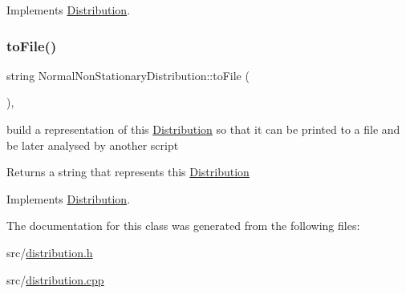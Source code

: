 Implements \mbox{\hyperlink{class_distribution_ac9c74d18549f532caa09ae86d8b25b55}{Distribution}}.

\mbox{\label{class_normal_non_stationary_distribution_a4f2f7cdfacf8b54a0cb2b5237213a693}} 
\subsubsection{\texorpdfstring{to\+File()}{toFile()}}
{\footnotesize\ttfamily string Normal\+Non\+Stationary\+Distribution\+::to\+File (\begin{DoxyParamCaption}{ }\end{DoxyParamCaption})\hspace{0.3cm}{\ttfamily [override]}, {\ttfamily [virtual]}}



build a representation of this \mbox{\hyperlink{class_distribution}{Distribution}} so that it can be printed to a file and be later analysed by another script 

\begin{DoxyReturn}{Returns}
a string that represents this \mbox{\hyperlink{class_distribution}{Distribution}} 
\end{DoxyReturn}


Implements \mbox{\hyperlink{class_distribution_ac41d57a4d7f82041810f886590a236a5}{Distribution}}.



The documentation for this class was generated from the following files\+:\begin{DoxyCompactItemize}
\item 
src/\mbox{\hyperlink{distribution_8h}{distribution.\+h}}\item 
src/\mbox{\hyperlink{distribution_8cpp}{distribution.\+cpp}}\end{DoxyCompactItemize}
